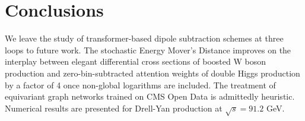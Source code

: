 \section{Conclusions}\label{sec:conclusions}

We leave the study of transformer-based dipole subtraction schemes at
three loops to future work. The stochastic Energy Mover's Distance
improves on the interplay between elegant differential cross sections of
boosted W boson production and zero-bin-subtracted attention weights of
double Higgs production by a factor of 4 once non-global logarithms are
included. The treatment of equivariant graph networks trained on CMS
Open Data is admittedly heuristic. Numerical results are presented for
Drell-Yan production at $\sqrt{s} = 91.2$ GeV.

